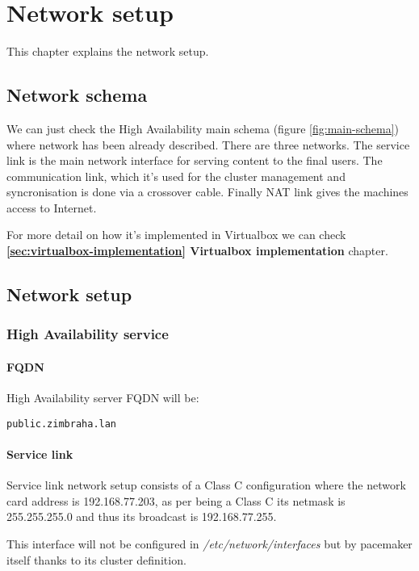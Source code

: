 

\chapter{Network setup}
\label{chap:network-setup}
This chapter explains the network setup.

\section {Network schema}
We can just check the High Availability main schema (figure \ref{fig:main-schema}) where network has been already described. There are three networks. The service link is the main network interface for serving content to the final users. The communication link, which it's used for the cluster management and syncronisation is done via a crossover cable. Finally NAT link gives the machines access to Internet.

For more detail on how it's implemented in Virtualbox we can check \textbf{\ref{sec:virtualbox-implementation} Virtualbox implementation} chapter.

\section {Network setup}

\subsection {High Availability service}
\subsubsection {FQDN}
High Availability server FQDN will be:
\begin{verbatim}
public.zimbraha.lan
\end{verbatim}

\subsubsection {Service link}
Service link network setup consists of a Class C configuration where the network card address is 192.168.77.203, as per being a Class C its netmask is 255.255.255.0 and thus its broadcast is 192.168.77.255.

This interface will not be configured in \textit{/etc/network/interfaces} but by pacemaker itself thanks to its cluster definition.


